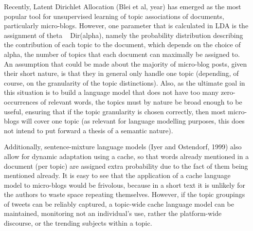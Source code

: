 \documentclass{article}
\begin{document}
Recently, Latent Dirichlet Allocation (Blei et al, year) has emerged as the most popular tool for unsupervised learning of topic associations of documents, particularly micro-blogs.
However, one parameter that is calculated in LDA is the assignment of theta ~ Dir(alpha), namely the probability distribution describing the contribution of each topic to the document, which depends on the choice of alpha, the number of topics that each document can maximally be assigned to. An assumption that could be made about the majority of micro-blog posts, given their short nature, is that they in general only handle one topic (depending, of course, on the granularity of the topic distinctions). Also, as the ultimate goal in this situation is to build a language model that does not have too many zero-occurrences of relevant words, the topics must by nature be broad enough to be useful, ensuring that if the topic granularity is chosen correctly, then most micro-blogs will cover one topic (as relevant for language modelling purposes, this does not intend to put forward a thesis of a semantic nature).

Additionally, sentence-mixture language models (Iyer and Ostendorf, 1999) also allow for dynamic adaptation using a cache, so that words already mentioned in a document (per topic) are assigned extra probability due to the fact of them being mentioned already. It is easy to see that the application of a cache language model to micro-blogs would be frivolous, because in a short text it is unlikely for the authors to waste space repeating themselves. However, if the topic groupings of tweets can be reliably captured, a topic-wide cache language model can be maintained, monitoring not an individual's use, rather the platform-wide discourse, or the trending subjects within a topic.
\end{document}
